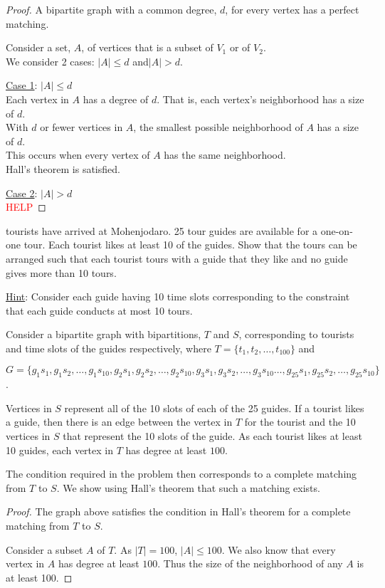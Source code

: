 \documentclass[a4paper]{exam}
\begin{document}
\begin{questions}
\begin{solution}
    \begin{proof} A bipartite graph with a common degree, $d$, for every vertex has a perfect matching.

      Consider a set, $A$, of vertices that is a subset of $V_1$ or of $V_2$.\\
      We consider 2 cases: $|A|\le d$ and$|A|> d$.

      \underline{Case 1}: $|A| \le d$\\
      Each vertex in $A$ has a degree of $d$. That is, each vertex's neighborhood has a size of $d$.\\
      With $d$ or fewer vertices in $A$, the smallest possible neighborhood of $A$ has a size of $d$.\\
      This occurs when every vertex of $A$ has the same neighborhood.\\
      Hall's theorem is satisfied.

      \underline{Case 2}: $|A| > d$\\
      \textcolor{red}{HELP}
      
    \end{proof}
  \end{solution}

   tourists have arrived at Mohenjodaro. 25 tour guides are available for a one-on-one tour. Each tourist likes at least 10 of the guides. Show that the tours can be arranged such that each tourist tours with a guide that they like and no guide gives more than 10 tours.

  \underline{Hint}: Consider each guide having 10 time slots corresponding to the constraint that each guide conducts at most 10 tours.
  \begin{solution}
    Consider a bipartite graph with bipartitions, $T$ and $S$, corresponding to tourists and time slots of the guides respectively, where $T=\{t_1,t_2,\ldots,t_{100}\}$ and
    
{\small
  $G=\{g_1s_1, g_1s_2,\ldots, g_1s_{10},g_2s_1, g_2s_2,\ldots, g_2s_{10},g_3s_1, g_3s_2,\ldots, g_3s_{10}\ldots,g_{25}s_1, g_{25}s_2,\ldots, g_{25}s_{10}\}$.
}

Vertices in $S$ represent all of the 10 slots of each of the 25 guides. If a tourist likes a guide, then there is an edge between the vertex in $T$ for the tourist and the 10 vertices in $S$ that represent the 10 slots of the guide. As each tourist likes at least 10 guides, each vertex in $T$ has degree at least $100$.

The condition required in the problem then corresponds to a complete matching from $T$ to $S$. We show using Hall's theorem that such a matching exists.

\begin{proof} The graph above satisfies the condition in Hall's theorem for a complete matching from $T$ to $S$.
  
Consider a subset $A$ of $T$. As $|T|=100$, $|A|\le 100$. We also know that every vertex in $A$ has degree at least $100$. Thus the size of the neighborhood of any $A$ is at least 100.
\end{proof}
\end{solution}

\end{questions}
\end{document}
